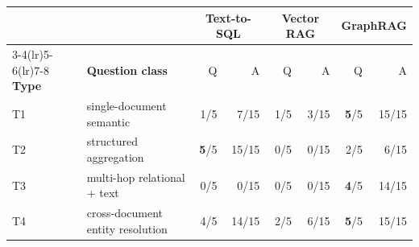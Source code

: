 \begin{tabular}{@{}ll rr rr rr@{}}
\toprule
& & \multicolumn{2}{c}{\textbf{Text-to-SQL}} & \multicolumn{2}{c}{\textbf{Vector RAG}} & \multicolumn{2}{c}{\textbf{GraphRAG}} \\
\cmidrule(lr){3-4}\cmidrule(lr){5-6}\cmidrule(lr){7-8}
\textbf{Type} & \textbf{Question class} & Q & A & Q & A & Q & A \\
\midrule
T1 & single-document semantic & 1/5 & 7/15 & 1/5 & 3/15 & \textbf{5}/5 & 15/15 \\
T2 & structured aggregation & \textbf{5}/5 & 15/15 & 0/5 & 0/15 & 2/5 & 6/15 \\
T3 & multi-hop relational + text & 0/5 & 0/15 & 0/5 & 0/15 & \textbf{4}/5 & 14/15 \\
T4 & cross-document entity resolution & 4/5 & 14/15 & 2/5 & 6/15 & \textbf{5}/5 & 15/15 \\
\bottomrule
\end{tabular}
